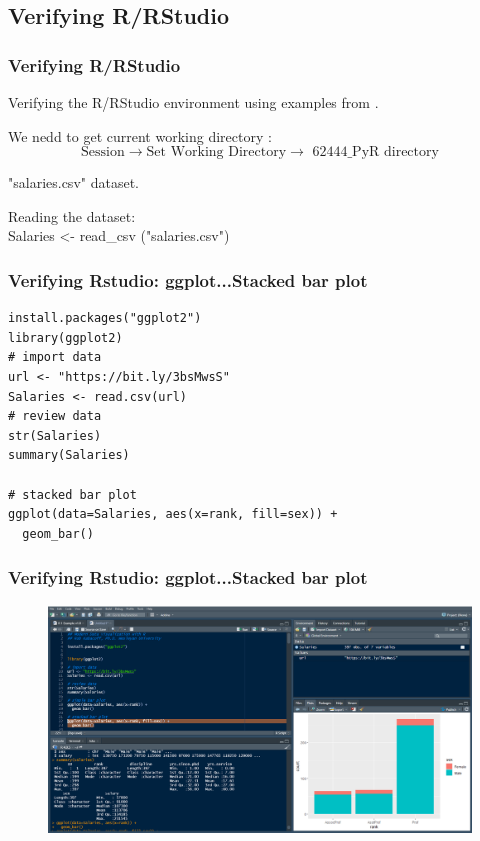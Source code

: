 \documentclass{beamer}
\begin{document}
\subsection{Verifying R/RStudio }
\begin{frame}
\frametitle{Verifying R/RStudio}
Verifying the R/RStudio environment using examples from \footnotesize\cite{Kabacoff2020}.\newline

We nedd to  get current working directory :
\[ \text {Session} \rightarrow \text{Set Working Directory} \rightarrow \text{  62444\_PyR directory} \]

"salaries.csv" dataset.\newline

Reading the dataset:\\
Salaries \textless{- read\_csv ("salaries.csv")}
\end{frame}

\begin{frame}[fragile] %
\frametitle{Verifying Rstudio: ggplot...Stacked bar plot}
\begin{example}[]
\begin{verbatim}
install.packages("ggplot2")
library(ggplot2)
# import data
url <- "https://bit.ly/3bsMwsS"
Salaries <- read.csv(url)
# review data
str(Salaries)
summary(Salaries)

# stacked bar plot
ggplot(data=Salaries, aes(x=rank, fill=sex)) + 
  geom_bar()
\end{verbatim}
\end{example}
\end{frame}
\begin{frame}
\frametitle{Verifying Rstudio: ggplot...Stacked bar plot}
\begin{figure}
\includegraphics[width=1\linewidth]{Seminar_1_images/R.PNG}
\end{figure}
\end{frame}
\end{document}
